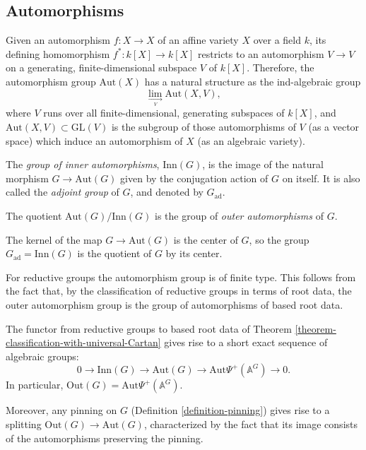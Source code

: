 \subsection{Automorphisms} 

Given an automorphism $f:X\to X$ of an affine variety $X$ over a field $k$, its defining homomorphism $f^*:k[X]\to k[X]$ restricts to an automorphism $V\to V$ on a generating, finite-dimensional subspace $V$ of $k[X]$. Therefore, the automorphism group $\text{Aut}(X)$ has a natural structure as the ind-algebraic group
$$ \underset{\underset{V}\to}\lim \text{Aut}(X,V),$$
where $V$ runs over all finite-dimensional, generating subspaces of $k[X]$, and $\text{Aut}(X,V)\subset \text{GL}(V)$ is the subgroup of those automorphisms of $V$ (as a vector space) which induce an automorphism of $X$ (as an algebraic variety).

\begin{definition}
 \label{definition-automorphism-group}
The {\it group of inner automorphisms}, $\text{Inn}(G)$, is the image of the natural morphism $G\to \text{Aut}(G)$ given by the conjugation action of $G$ on itself. It is also called the {\it adjoint group} of $G$, and denoted by $G_{\text{ad}}$. 

The quotient $\text{Aut}(G)/\text{Inn}(G)$ is the group of {\it outer automorphisms} of $G$.
\end{definition}

The kernel of the map $G\to \text{Aut}(G)$ is the center of $G$, so the group $G_{\text{ad}}=\text{Inn}(G)$ is the quotient of $G$ by its center.

For reductive groups the automorphism group is of finite type. This follows from the fact that, by the classification of reductive groups in terms of root data, the outer automorphism group is the group of automorphisms of based root data.

\begin{proposition}
 \label{proposition-automorphism-sequence}
The functor from reductive groups to based root data of Theorem \ref{theorem-classification-with-universal-Cartan} gives rise to a short exact sequence of algebraic groups:
\begin{equation}
 \label{equation-Inn-Aut-Out}
0\to \text{Inn}(G)\to \text{Aut}(G)\to \text{Aut}\Psi^+(\mathbb A^G) \to 0.
\end{equation}
In particular, $\text{Out}(G)=\text{Aut}\Psi^+(\mathbb A^G) $. 

Moreover, any pinning on $G$ (Definition \ref{definition-pinning}) gives rise to a splitting $\text{Out}(G)\to \text{Aut}(G)$, characterized by the fact that its image consists of the automorphisms preserving the pinning.
\end{proposition}

